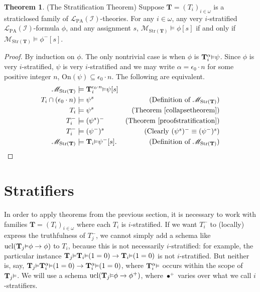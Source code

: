 \documentclass[reqno]{article}
\theoremstyle{definition}
\newtheorem{theorem}{Theorem}
\def\L{\mathscr{L}}
\def\M{\mathscr{M}}
\def\T{\mathbf{T}}
\def\LPA{\L_{\mathrm{PA}}}
\def\indset{\mathcal I}
\def\onset{\mathrm{On}}
\renewcommand{\Pr}[1]{\T_{#1}\mbox{\small${\vDash}$}}
\newcommand{\Prr}[2]{\T^{#1}_{#2}\mbox{\small${\vDash}$}}
\newcommand{\ucl}[1]{\mathrm{ucl}(#1)}
\newcommand{\str}[1]{\mathrm{Str}(#1)} \newcommand{\Str}[1]{\str{#1}}
\begin{document}
\begin{theorem}
\label{stratificationtheorem}
(The Stratification Theorem)
Suppose $\T=(T_i)_{i\in\omega}$ is a straticlosed family of $\LPA(\indset)$-theories.
For any $i\in\omega$, any very $i$-stratified 
$\LPA(\indset)$-formula $\phi$, and any assignment $s$,
$\M_{\str{\T}}\models\phi[s]$
if and only if $\M_{\str{\T}}\models\phi^-[s]$.
\end{theorem}

\begin{proof}
By induction on $\phi$.  The only nontrivial case is
when $\phi$ is $\Prr\alpha i\psi$.
Since $\phi$ is very $i$-stratified, $\psi$ is very $i$-stratified and we may write
$\alpha=\epsilon_0\cdot n$
for some positive integer $n$,
$\onset(\psi)\subseteq\epsilon_0\cdot n$.
The following are equivalent.
\begin{align*}
\M_{\str{\T}} &\models \Prr{\epsilon_0\cdot n}i\psi[s]\\
T_i\cap(\epsilon_0\cdot n) &\models \psi^s
  &\mbox{(Definition of $\M_{\str{\T}}$)}\\
T_i &\models \psi^s
  &\mbox{(Theorem \ref{collapsetheorem})}\\
T^-_i &\models (\psi^s)^-
  &\mbox{(Theorem \ref{proofstratification})}\\
T^-_i &\models (\psi^-)^s
  &\mbox{(Clearly $(\psi^s)^-\equiv(\psi^-)^s$)}\\
\M_{\str{\T}} &\models \Pr i\psi^-[s].
  &\mbox{(Definition of $\M_{\str{\T}}$)}
\end{align*}
\end{proof}


\section{Stratifiers}
\label{stratifiersection}

In order to apply theorems from the previous section, it is necessary to work
with families $\T=(T_i)_{i\in\omega}$ where each $T_i$ is $i$-stratified.
If we want $T^-_i$ to (locally) express the truthfulness of $T^-_j$, we cannot simply
add a schema like $\ucl{\Pr j\phi\rightarrow\phi}$ to $T_i$, because this is not
necessarily $i$-stratified:  for example, the particular instance
$\Pr j\Pr i(1=0) \rightarrow \Pr i(1=0)$
is not $i$-stratified.  But neither is, say, $\Pr j\Prr\alpha i(1=0)\rightarrow \Prr\alpha i(1=0)$,
where $\Prr\alpha i$ occurs within the scope of $\Pr j$.
We will use a schema $\ucl{\Pr j\phi\rightarrow\phi^+}$,
where $\bullet^+$ varies over what we call $i$-stratifiers.
\end{document}
